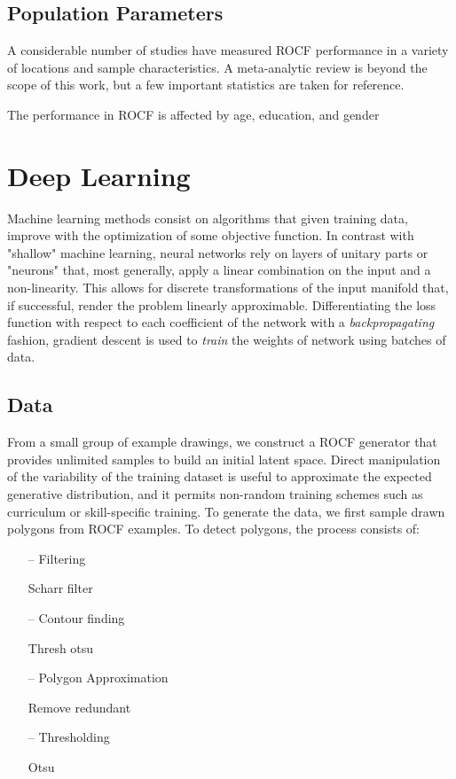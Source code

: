 \documentclass[twocolumn]{article}
\begin{document}
\subsection{Population Parameters}
A considerable number of studies have measured ROCF performance in a variety of locations and sample characteristics. A meta-analytic review is beyond the scope of this work, but a few important statistics are taken for reference.


The performance in ROCF is affected by age, education, and gender \cite{7}


\section{Deep Learning}

Machine learning methods consist on algorithms that given training data, improve with the optimization of some objective function. In contrast with "shallow" machine learning, neural networks rely on layers of unitary parts or "neurons" that, most generally, apply a linear combination on the input and a non-linearity. This allows for discrete transformations of the input manifold that, if successful, render the problem linearly approximable. Differentiating the loss function with respect to each coefficient of the network with a \textit{backpropagating} fashion, gradient descent is used to \textit{train} the weights of network using batches of data. 


\subsection{Data}
From a small group of example drawings, we construct a ROCF generator that provides unlimited samples to build an initial latent space. Direct manipulation of the variability of the training dataset is useful to approximate the expected generative distribution, and it permits non-random training schemes such as curriculum or skill-specific training.
To generate the data, we first sample drawn polygons from ROCF examples. To detect polygons, the process consists of:
\begin{enumerate}
\item[--] Filtering

    Scharr filter 
\item[--] Contour finding

    Thresh otsu
\item[--] Polygon Approximation

    Remove redundant 
\item[--] Thresholding

    Otsu
\end{enumerate}
\end{document}
